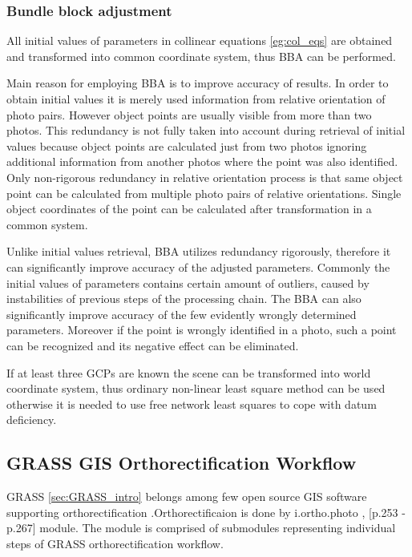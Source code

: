 \documentclass[a4paper,12pt]{article}
\begin{document}
\subsubsection{Bundle block adjustment}

All initial values of parameters in collinear equations \eqref{eg:col_eqs} are obtained and transformed into common coordinate system, thus 
BBA can be performed.

Main reason for employing BBA is to improve accuracy of results.
In order to obtain initial values it is merely used information from relative orientation of photo pairs.
However object points are usually visible from more than two photos. This redundancy is not fully taken 
into account during retrieval of initial values because object points are calculated just from two photos
ignoring additional information from another photos where the point was also identified.
Only non-rigorous redundancy  in relative orientation process is that same object point can 
be calculated from multiple photo pairs of relative orientations.
Single object coordinates of the point can be calculated after transformation in a common system.  


Unlike initial values retrieval, BBA utilizes redundancy rigorously, therefore 
it can significantly improve accuracy of the adjusted parameters.
Commonly the initial values of parameters contains certain amount of outliers, caused by instabilities of previous steps of the processing chain.
The BBA can also significantly improve accuracy of the few evidently wrongly determined parameters.
Moreover if the point is wrongly identified in a photo, such a point can be recognized and its 
negative effect can be eliminated.

If at least three GCPs are known the scene can be transformed into world coordinate system, thus ordinary non-linear least square method \label{sec:non_least} 
can be used otherwise
it is needed to use free network least squares \label{sec:free_net_least} to cope with datum deficiency. 

\subsection{GRASS GIS Orthorectification Workflow}

GRASS \ref{sec:GRASS_intro} belongs among few open source GIS software supporting orthorectification
\cite{rocchini2012robust}.Orthorectificaion is done 
by i.ortho.photo \cite{i.ortho.photo}, \cite{neteler2008open}[p.253 - p.267] module.
The module is comprised of submodules representing individual steps of 
GRASS orthorectification workflow.
\end{document}
